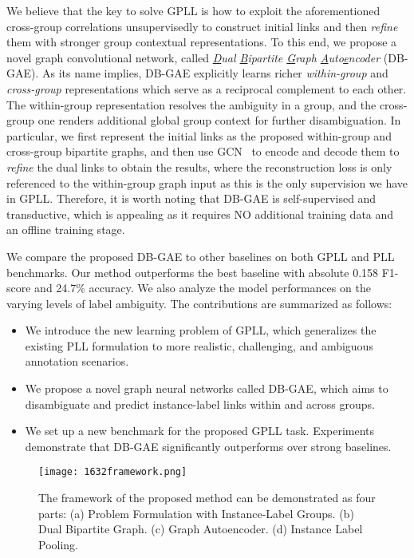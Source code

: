 \documentclass[letterpaper]{article} \usepackage{aaai20}  \usepackage{times}  \usepackage{helvet} \usepackage{courier}  \usepackage[hyphens]{url}  \usepackage{graphicx} \urlstyle{rm} \def\UrlFont{\rm}  \frenchspacing  \setlength{\pdfpagewidth}{8.5in}  \setlength{\pdfpageheight}{11in}  \frenchspacing
\begin{document}
We believe that the key to solve GPLL is how to exploit the aforementioned cross-group correlations unsupervisedly to construct initial links  and then \emph{refine} them with stronger group contextual representations. To this end, we propose a novel graph convolutional network, called \textit{\underline{D}ual \underline{B}ipartite \underline{G}raph \underline{A}uto\underline{e}ncoder} (DB-GAE). 
As its name implies, DB-GAE explicitly learns richer \emph{within-group} and \emph{cross-group} representations which serve as a reciprocal complement to each other. The within-group representation resolves the ambiguity in a group, and the cross-group one renders additional global group context for further disambiguation. In particular, we first represent the initial links as the proposed within-group and cross-group bipartite graphs, and then use GCN~\cite{berg2017graph} to encode and decode them to \emph{refine} the dual links to obtain the results, where the reconstruction loss is only referenced to the within-group graph input as this is the only supervision we have in GPLL. Therefore, it is worth noting that DB-GAE is self-supervised and transductive, which is appealing as it requires NO additional training data and an offline training stage.

We compare the proposed DB-GAE to other baselines on both GPLL and PLL benchmarks. Our method outperforms the best baseline with absolute 0.158 F1-score and 24.7\% accuracy. We also analyze the model performances on the varying levels of label ambiguity. The contributions are summarized as follows:
\begin{itemize}
\item We introduce the new learning problem of GPLL, which generalizes the existing PLL formulation to more realistic, challenging, and ambiguous annotation scenarios.

\item We propose a novel graph neural networks called DB-GAE, which aims to disambiguate and predict instance-label links within and across groups.

\item We set up a new benchmark for the proposed GPLL task. Experiments demonstrate that DB-GAE significantly outperforms over strong baselines.

\end{itemize}

\begin{figure*}[t]
\centering
  \texttt{[image: 1632framework.png]}
\caption{The framework of the proposed method can be demonstrated as four parts: (a) Problem Formulation with Instance-Label Groups. (b) Dual Bipartite Graph. (c) Graph Autoencoder. (d) Instance Label Pooling.
  }
  \label{fig:framework}
\end{figure*}
\end{document}
